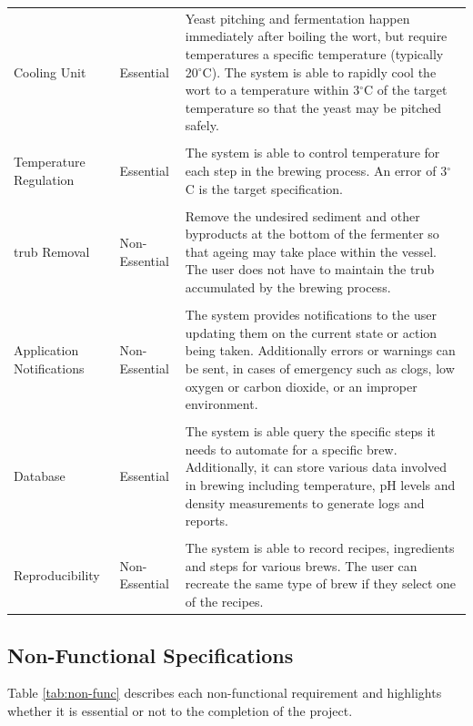 \documentclass{article}
\begin{document}
\begin{table}[H]
\centering
\begin{tabularx}{\textwidth}{l l Z}
Cooling Unit
& Essential
& Yeast pitching and fermentation happen immediately after boiling the wort, but require temperatures a specific temperature (typically 20$^{\circ}$C). The system is able to rapidly cool the wort to a temperature within 3$^{\circ}$C of the target temperature so that the yeast may be pitched safely.
\\\\
Temperature Regulation
& Essential
& The system is able to control temperature for each step in the brewing process.  An error of 3$^{\circ}$C is the target specification.
\\\\
\Gls{trub} Removal
& Non-Essential
& Remove the undesired sediment and other byproducts at the bottom of the fermenter so that ageing may take place within the vessel.  The user does not have to maintain the \gls{trub} accumulated by the brewing process.
\\\\
Application Notifications
& Non-Essential
& The system provides notifications to the user updating them on the current state or action being taken.  Additionally errors or warnings can be sent, in cases of emergency such as clogs, low oxygen or carbon dioxide, or an improper environment.
\\\\
Database
& Essential
& The system is able query the specific steps it needs to automate for a specific brew.  Additionally, it can store various data involved in brewing including temperature, pH levels and density measurements to generate logs and reports.
\\\\
Reproducibility
& Non-Essential
& The system is able to record recipes, ingredients and steps for various brews. The user can recreate the same type of brew if they select one of the recipes.
\\
\bottomrule
\end{tabularx}
\label{tab:func}
\end{table}

\pagebreak
\subsection{Non-Functional Specifications}
Table \ref{tab:non-func} describes each non-functional requirement and highlights whether it is essential or not to the completion of the project.
\end{document}
